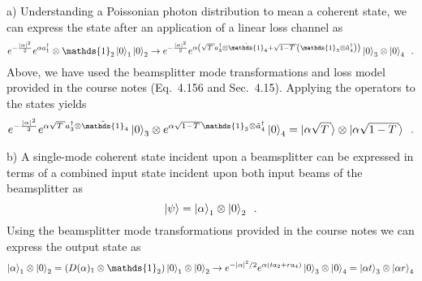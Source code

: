 \begin{homeworkProblem}
    \begin{homeworkSection}{a)}
        Understanding a Poissonian photon distribution to mean a coherent state,
        we can express the state after an application of a linear loss channel
        as
        \[
            e^{-\frac{\left| \alpha \right|^2}{2}} e^{\alpha a_1^\dagger } \otimes
            \mathds{1}_2
            \ket{0}_{1} \ket{0}_{2}
            \to e^{-\frac{\left| \alpha \right|^2}{2}} e^{\alpha \left(
                    \sqrt{T} a^\dagger_3 \otimes \tilde{\mathds{1}}_4 +
                    \sqrt{1-T} \left( \mathds{1}_3
                \otimes \tilde{a}^\dagger_4 \right) \right)} \ket{0}_3 \otimes
                \ket{0}_4 \enskip.
        \]
        Above, we have used the beamsplitter mode transformations and loss model
        provided in the course notes (Eq.~4.156 and Sec.~4.15). Applying the
        operators to the states yields
        \[
            e^{-\frac{\left| \alpha \right|^2}{2}} e^{\alpha \sqrt{T}
            a^\dagger_3 \otimes \tilde{\mathds{1}}_4} \ket{0}_3
            \otimes
            e^{\alpha \sqrt{1-T} \mathds{1}_3 \otimes \tilde{a}^\dagger_4 }
            \ket{0}_4 = \ket{\alpha \sqrt{T}} \otimes \ket{\alpha \sqrt{1-T}} \enskip.
        \]
    \end{homeworkSection}
    \begin{homeworkSection}{b)}
        A single-mode coherent state incident upon a beamsplitter can be
        expressed in terms of a combined input state incident upon both input
        beams of the beamsplitter as
        \[
            \ket{\psi} = \ket{\alpha}_1 \otimes \ket{0}_2 \enskip.
        \]
        Using the beamsplitter mode transformations provided in the course notes
        we can express the output state as
        \[
            \ket{\alpha}_1 \otimes \ket{0}_2 = (D(\alpha)_1 \otimes \mathds{1}_2) \ket{0}_1 \otimes
            \ket{0}_2 \to e^{-\left| \alpha \right|^2/2} e^{\alpha \left( t a_2
            + r a_4 \right)} \ket{0}_3 \otimes \ket{0}_4
            = \ket{\alpha t}_3 \otimes \ket{\alpha r}_4
        \]
    \end{homeworkSection}
\end{homeworkProblem}
